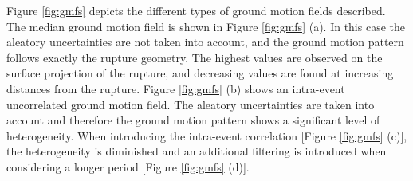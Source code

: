 Figure \ref{fig:gmfs} depicts the different types of ground motion fields 
described.
The median ground motion field is shown in Figure \ref{fig:gmfs} (a). 
%
In this case the aleatory uncertainties are not taken into account, 
and the ground motion pattern follows exactly the rupture geometry. 
The highest values are observed on the surface projection of the rupture, and 
decreasing values are found at increasing distances from the rupture. 
%
Figure \ref{fig:gmfs} (b) shows an intra-event uncorrelated ground motion 
field. The aleatory uncertainties are taken into account and therefore the
ground motion pattern shows a significant level of heterogeneity. 
%
When introducing the intra-event correlation [Figure \ref{fig:gmfs} (c)], 
the heterogeneity is diminished and an additional filtering is introduced 
when considering a longer period [Figure \ref{fig:gmfs} (d)].
%
